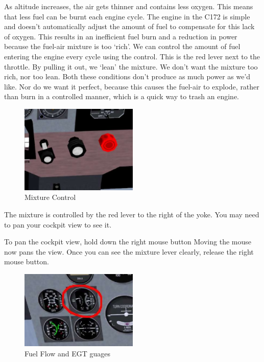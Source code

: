 As altitude increases, the air gets thinner and contains less oxygen.
This means that less fuel can be burnt each engine cycle.
The engine in the C172 is simple and doesn't automatically
adjust the amount of fuel to compensate for this lack of oxygen.
This results in an inefficient fuel burn and a reduction in power
because the fuel-air mixture is too `rich'. We can control the
amount of fuel entering the engine every cycle using the  control.
This is the red lever next to the throttle. By pulling it out, we `lean'
the mixture. We don't want the mixture too rich, nor too lean.
Both these conditions don't produce as much power as we'd like.
Nor do we want it perfect, because this causes the fuel-air to explode,
rather than burn in a controlled manner, which is a quick way to trash an engine.

\begin{figure}[!htp]
\centering
\includegraphics[width=0.5\textwidth]{mixture}
\caption{Mixture Control\label{mixture}}
\end{figure}

The mixture is controlled by the red lever to the right of the yoke.
You may need to pan your cockpit view to see it.

To pan the cockpit view, hold down the right mouse button Moving the mouse now
pans the view. Once you can see the mixture lever clearly, release the right
mouse button.

\begin{figure}[!htp]
\centering
\includegraphics[width=0.5\textwidth]{fuel_flow}
\caption{Fuel Flow and EGT guages\label{egt}}
\end{figure}

